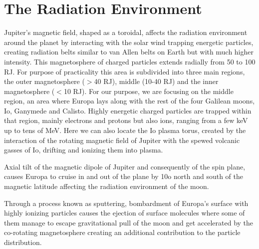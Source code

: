 \section{The Radiation Environment}\label{sec:radiation_environment}
Jupiter’s magnetic field, shaped as a toroidal, affects the radiation environment around the planet by interacting with the solar wind trapping energetic particles, creating radiation belts similar to van Allen belts on Earth but with much higher intensity. This magnetosphere of charged particles extends radially from 50 to 100 RJ. For purpose of practicality this area is subdivided into three main regions, the outer magnetosphere ($>$40 RJ), middle (10-40 RJ) and the inner magnetosphere ($<$10 RJ). For our purpose, we are focusing on the middle region, an area where Europa lays along with the rest of the four Galilean moons, Io, Ganymede and Calisto. Highly energetic charged particles are trapped within that region, mainly electrons and protons but also ions, ranging from a few keV up to tens of MeV. Here we can also locate the Io plasma torus, created by the interaction of the rotating magnetic field of Jupiter with the spewed volcanic gasses of Io, drifting and ionizing them into plasma.

Axial tilt of the magnetic dipole of Jupiter and consequently of the spin plane, causes Europa to cruise in and out of the plane by 10o north and south of the magnetic latitude affecting the radiation environment of the moon. 

Through a process known as sputtering, bombardment of Europa’s surface with highly ionizing particles causes the ejection of surface molecules where some of them manage to escape gravitational pull of the moon and get accelerated by the co-rotating magnetosphere creating an additional contribution to the particle distribution. 

